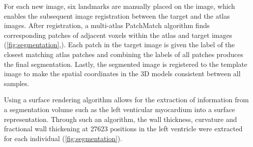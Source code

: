 For each new image, six landmarks are manually placed on the image, which enables the subsequent image registration between the target and the atlas images. After registration, a multi-atlas PatchMatch algorithm finds corresponding patches of adjacent voxels within the atlas and target images (\cref{fig:segmentation},). Each patch in the target image is given the label of the closest matching atlas patches and combining the labels of all patches produces the final segmentation. Lastly, the segmented image is registered to the template image to make the spatial coordinates in the 3D models consistent between all samples.  

Using a surface rendering algorithm allows for the extraction of information from a segmentation volume such as the left venticular myocardium into a surface representation. Through such an algorithm, the wall thickness, curvature and  fractional wall thickening at \num{27623} positions in the left ventricle were extracted for each individual (\cref{fig:segmentation}). %
\\

